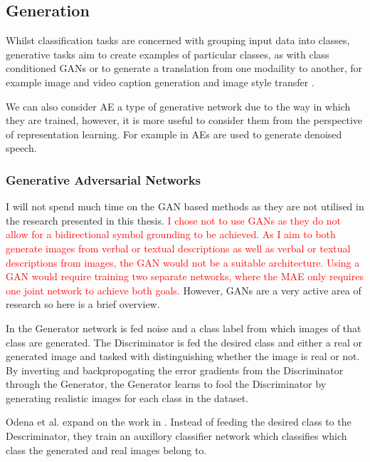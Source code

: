 \subsection{Generation}
Whilst classification tasks are concerned with grouping input data into classes, generative tasks aim to create examples of particular classes, as with class conditioned \acp{GAN} \cite{mirza2014conditional, odena2017conditional} or to generate a translation from one modaility to another, for example image and video caption generation \cite{vinyals2015show, lebret2015phrase, donahue2015long, jia2015guiding, rohrbach2014coherent, rohrbach2013translating, yao2015describing, yao2015video, venugopalan2014translating, johnson2016densecap, ordonez2011im2text, sheppard2016video} and image style transfer \cite{zhu2017unpaired}.

We can also consider \ac{AE} a type of generative network due to the way in which they are trained, however, it is more useful to consider them from the perspective of representation learning. For example in \cite{lu2013speech} \acp{AE} are used to generate denoised speech.

\subsubsection{Generative Adversarial Networks}
I will not spend much time on the \ac{GAN} based methods as they are not utilised in the research presented in this thesis. \textcolor{red}{I chose not to use \acp{GAN} as they do not allow for a bidirectional symbol grounding to be achieved. As I aim to both generate images from verbal or textual descriptions as well as verbal or textual descriptions from images, the \ac{GAN} would not be a suitable architecture. Using a \ac{GAN} would require training two separate networks, where the \ac{MAE} only requires one joint network to achieve both goals.} However, \acp{GAN} are a very active area of research so here is a brief overview. 

In \cite{mirza2014conditional} the Generator network is fed noise and a class label from which images of that class are generated. The Discriminator is fed the desired class and either a real or generated image and tasked with distinguishing whether the image is real or not. By inverting and backpropogating the error gradients from the Discriminator through the Generator, the Generator learns to fool the Discriminator by generating realistic images for each class in the dataset.

Odena et al. \cite{odena2017conditional} expand on the work in \cite{mirza2014conditional}. Instead of feeding the desired class to the Descriminator, they train an auxillory classifier network which classifies which class the generated and real images belong to.

